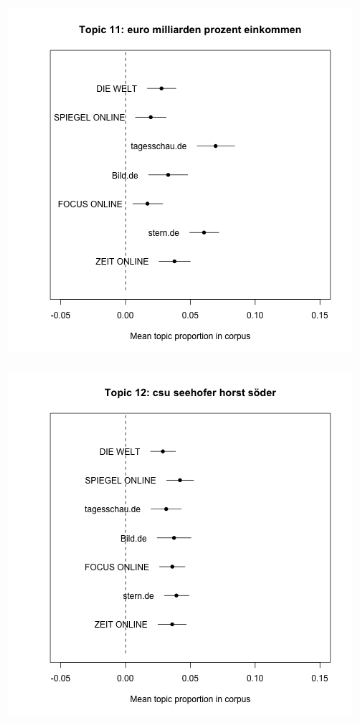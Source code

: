 \documentclass[12pt,a4paper,notitlepage]{article}
\begin{document}
\begin{figure}[H]
\begin{center}
\begin{subfigure}[normla]{0.2\textwidth}
		\end{subfigure}
		\begin{subfigure}[normla]{0.2\textwidth}
			\includegraphics[width=\textwidth]{../figs/estimate_effect11.png}
		\end{subfigure}
		\begin{subfigure}[normla]{0.2\textwidth}
			\includegraphics[width=\textwidth]{../figs/estimate_effect12.png}

\end{subfigure}
\end{center}
\end{figure}
\end{document}
